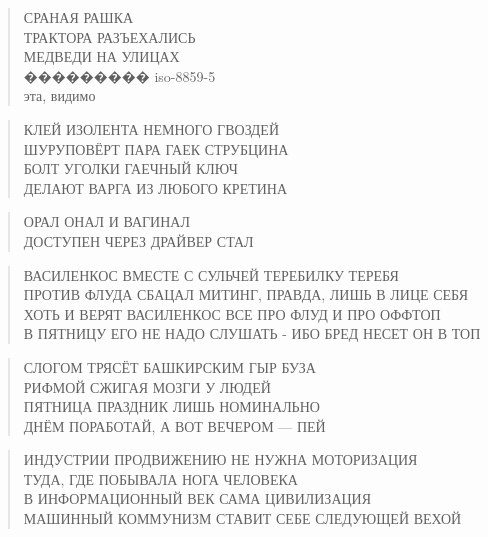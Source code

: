 \poemtitle{***}
\begin{verse}
СРАНАЯ РАШКА\\
ТРАКТОРА РАЗЪЕХАЛИСЬ\\
МЕДВЕДИ НА УЛИЦАХ\\
���������  iso-8859-5\\
эта, видимо
\end{verse}

\poemtitle{***}
\begin{verse}
КЛЕЙ ИЗОЛЕНТА НЕМНОГО ГВОЗДЕЙ\\
ШУРУПОВЁРТ ПАРА ГАЕК СТРУБЦИНА\\
БОЛТ УГОЛКИ ГАЕЧНЫЙ КЛЮЧ\\
ДЕЛАЮТ ВАРГА ИЗ ЛЮБОГО КРЕТИНА
\end{verse}

\poemtitle{***}
\begin{verse}
ОРАЛ ОНАЛ И ВАГИНАЛ\\
ДОСТУПЕН ЧЕРЕЗ ДРАЙВЕР СТАЛ
\end{verse}

\poemtitle{***}
\begin{verse}
ВАСИЛЕНКОС ВМЕСТЕ С СУЛЬЧЕЙ ТЕРЕБИЛКУ ТЕРЕБЯ\\
ПРОТИВ ФЛУДА СБАЦАЛ МИТИНГ, ПРАВДА, ЛИШЬ В ЛИЦЕ СЕБЯ\\
ХОТЬ И ВЕРЯТ ВАСИЛЕНКОС ВСЕ ПРО ФЛУД И ПРО ОФФТОП\\
В ПЯТНИЦУ ЕГО НЕ НАДО СЛУШАТЬ - ИБО БРЕД НЕСЕТ ОН В ТОП
\end{verse}

\poemtitle{***}
\begin{verse}
СЛОГОМ ТРЯСЁТ БАШКИРСКИМ ГЫР БУЗА\\
РИФМОЙ СЖИГАЯ МОЗГИ У ЛЮДЕЙ\\
ПЯТНИЦА ПРАЗДНИК ЛИШЬ НОМИНАЛЬНО\\
ДНЁМ ПОРАБОТАЙ, А ВОТ ВЕЧЕРОМ — ПЕЙ
\end{verse}

\poemtitle{***}
\begin{verse}
ИНДУСТРИИ ПРОДВИЖЕНИЮ НЕ НУЖНА МОТОРИЗАЦИЯ\\
ТУДА, ГДЕ ПОБЫВАЛА НОГА ЧЕЛОВЕКА\\
В ИНФОРМАЦИОННЫЙ ВЕК САМА ЦИВИЛИЗАЦИЯ\\
МАШИННЫЙ КОММУНИЗМ СТАВИТ СЕБЕ СЛЕДУЮЩЕЙ ВЕХОЙ
\end{verse}

